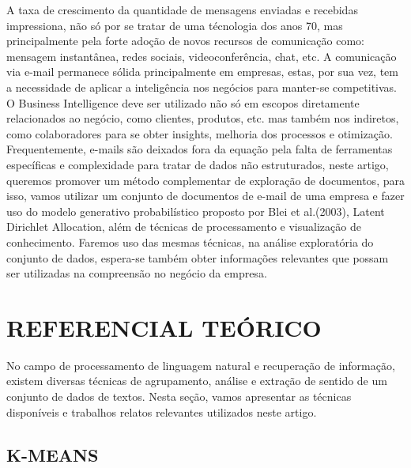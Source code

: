 \documentclass[12pt,a4paper]{article}
\begin{document}
  A taxa de crescimento da quantidade de mensagens enviadas e recebidas impressiona, não só por se tratar de uma técnologia dos anos 70, mas principalmente pela forte adoção de novos recursos de comunicação como: mensagem instantânea, redes sociais, videoconferência, chat, etc. A comunicação via e-mail permanece sólida principalmente em empresas, estas, por sua vez, tem a necessidade de aplicar a inteligência nos negócios para manter-se competitivas. O Business Intelligence deve ser utilizado não só em escopos diretamente relacionados ao negócio, como clientes, produtos, etc. mas também nos indiretos, como colaboradores para se obter insights, melhoria dos processos e otimização. Frequentemente, e-mails são deixados fora da equação pela falta de ferramentas específicas e complexidade para tratar de dados não estruturados, neste artigo, queremos promover um método complementar de exploração de documentos, para isso, vamos utilizar um conjunto de documentos de e-mail de uma empresa e fazer uso do modelo generativo probabilístico proposto por Blei et al.(2003), Latent Dirichlet Allocation, além de técnicas de processamento e visualização de conhecimento. Faremos uso das mesmas técnicas, na análise exploratória do conjunto de dados, espera-se também obter informações relevantes que possam ser utilizadas na compreensão no negócio da empresa.
  
  
  \section{REFERENCIAL TEÓRICO}
  
  
  
  
  
  No campo de processamento de linguagem natural e recuperação de informação, existem diversas técnicas de agrupamento, análise e extração de sentido de um conjunto de dados de textos. Nesta seção, vamos apresentar as técnicas disponíveis e trabalhos relatos relevantes utilizados neste artigo.
  
  \subsection{K-MEANS}
  
\end{document}
